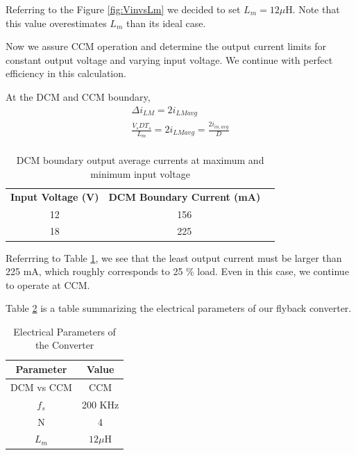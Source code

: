 \documentclass[12pt]{article}
\begin{document}
\begin{itemize}
        Referring to the Figure \ref{fig:VinvsLm} we decided to set $L_m = 12\mu$H. Note that this value overestimates $L_m$ than its ideal case. 
        
        Now we assure CCM operation and determine the output current limits for constant output voltage and varying input voltage. We continue with perfect efficiency in this calculation.

        At the DCM and CCM boundary, 
        \begin{align*}
            \Delta i_{LM} = 2 i_{LMavg}\\
            \frac{V_sDT_s}{L_m} = 2 i_{LMavg} =\frac{2i_{in,avg}}{D}\\
        \end{align*}

        \begin{table}[H]
        \centering
        \caption{DCM boundary output average currents at maximum and minimum input voltage}
        \begin{tabular}{|c|c|l}
        \cline{1-2}
        \textbf{Input Voltage (V)} & \textbf{DCM Boundary Current (mA)} &  \\ \cline{1-2}
        12                         & 156                                &  \\ \cline{1-2}
        18                         & 225                                &  \\ \cline{1-2}
        \end{tabular}
        \label{tab:DCM}
        \end{table}

        Referrring to Table \ref{tab:DCM}, we see that the least output current must be larger than 225 mA, which roughly corresponds to 25 \% load. Even in this case, we continue to operate at CCM.
    \end{itemize}

    Table \ref{tab:elec_sum} is a table summarizing the electrical parameters of our flyback converter.

    \begin{table}[H]
    \centering
    \caption{Electrical Parameters of the Converter}
    \begin{tabular}{|c|c|}
    \hline
    \textbf{Parameter} & \textbf{Value} \\ \hline
    DCM vs CCM         & CCM            \\ \hline
    $f_s$              & 200 KHz        \\ \hline
    N                  & 4              \\ \hline
    $L_m$              & $12\mu$H       \\ \hline
    \end{tabular}
    \label{tab:elec_sum}
    \end{table}
\end{document}
